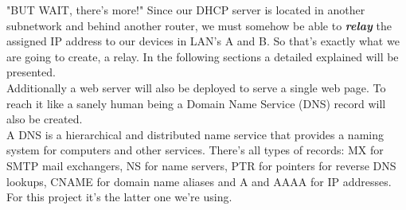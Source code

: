 \documentclass[11pt,a4paper]{report}
\begin{document}
        "BUT WAIT, there's more!" Since our DHCP server is located in another subnetwork and behind another router, we must somehow be able to \textbf{\textit{relay}} the assigned IP address to our devices in LAN's A and B. So that's exactly what we are going to create, a relay. In the following sections a detailed explained will be presented.\\

        Additionally a web server will also be deployed to serve a single web page. To reach it like a sanely human being a Domain Name Service (DNS) record will also be created.\\
        A DNS is a hierarchical and distributed name service that provides a naming system for computers and other services. There's all types of records: MX for SMTP mail exchangers, NS for name servers, PTR for pointers for reverse DNS lookups, CNAME for domain name aliases and A and AAAA for IP addresses. For this project it's the latter one we're using.
\end{document}
